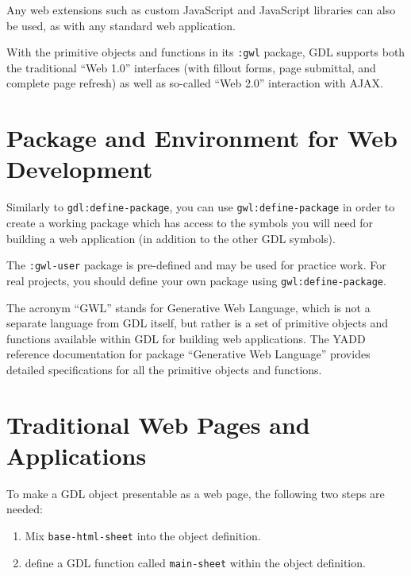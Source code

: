 \documentclass [11pt]{book}
\begin{document}
Any web extensions such as custom JavaScript and JavaScript libraries
can also be used, as with any standard web application.



With the primitive objects and functions in its \texttt{:gwl} package, GDL supports both the traditional ``Web 1.0''
interfaces (with fillout forms, page submittal, and complete page
refresh) as well as so-called ``Web 2.0'' interaction with AJAX.



\section{Package and Environment for Web Development}

\label{sec:packageandenvironmentforwebdevelopment}



Similarly to \texttt{gdl:define-package}, you can use \texttt{gwl:define-package} in order to create a working
package which has access to the symbols you will need for building a
web application (in addition to the other GDL symbols).



The \texttt{:gwl-user} package is pre-defined and may be used for practice
work. For real projects, you should define your own package using \texttt{gwl:define-package}.



The acronym ``GWL'' stands for Generative Web Language,
which is not a separate language from GDL itself, but rather is a set
of primitive objects and functions available within GDL for building
web applications. The YADD reference documentation for package
``Generative Web Language'' provides detailed specifications for all
the primitive objects and functions.



\section{Traditional Web Pages and Applications}

\label{sec:traditionalwebpagesandapplications}



To make a GDL object presentable as a web page, the following two
steps are needed:

\begin{enumerate}

\item Mix \texttt{base-html-sheet} into the object definition.

\item define a GDL function called \texttt{main-sheet} within the object definition.

\end{enumerate}
\end{document}
